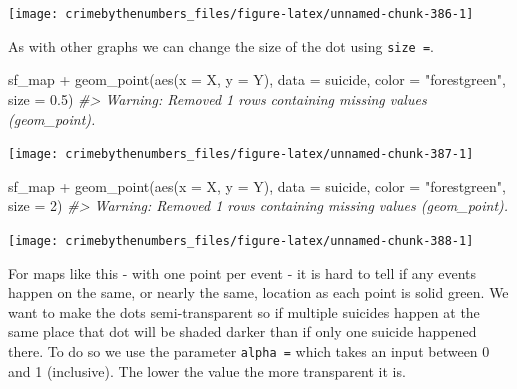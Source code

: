 \documentclass[
]{krantz}
\makeatletter
\newenvironment{Shaded}{\begin{snugshade}}{\end{snugshade}}
\newcommand{\AttributeTok}[1]{\textcolor[rgb]{0.61,0.61,0.61}{#1}}
\newcommand{\CommentTok}[1]{\textcolor[rgb]{0.37,0.37,0.37}{\textit{#1}}}
\newcommand{\DecValTok}[1]{\textcolor[rgb]{0.06,0.06,0.06}{#1}}
\newcommand{\FloatTok}[1]{\textcolor[rgb]{0.06,0.06,0.06}{#1}}
\newcommand{\FunctionTok}[1]{\textcolor[rgb]{0,0,0}{#1}}
\newcommand{\NormalTok}[1]{#1}
\newcommand{\SpecialCharTok}[1]{\textcolor[rgb]{0,0,0}{#1}}
\newcommand{\StringTok}[1]{\textcolor[rgb]{0.5,0.5,0.5}{#1}}
\newenvironment{kframe}{%
\medskip{}
\setlength{\fboxsep}{.8em}
 \def\at@end@of@kframe{}%
 \ifinner\ifhmode%
  \def\at@end@of@kframe{\end{minipage}}%
  \begin{minipage}{\columnwidth}%
 \fi\fi%
 \def\FrameCommand##1{\hskip\@totalleftmargin \hskip-\fboxsep
 \colorbox{shadecolor}{##1}\hskip-\fboxsep
     \hskip-\linewidth \hskip-\@totalleftmargin \hskip\columnwidth}%
 \MakeFramed {\advance\hsize-\width
   \@totalleftmargin\z@ \linewidth\hsize
   \@setminipage}}%
 {\par\unskip\endMakeFramed%
 \at@end@of@kframe}
\renewenvironment{Shaded}{\begin{kframe}}{\end{kframe}}
\makeatother
\begin{document}
\begin{center}\texttt{[image: crimebythenumbers\_files/figure-latex/unnamed-chunk-386-1]} \end{center}

As with other graphs we can change the size of the dot using \texttt{size\ =}.

\begin{Shaded}
\begin{Highlighting}[]
\NormalTok{sf\_map }\SpecialCharTok{+}
  \FunctionTok{geom\_point}\NormalTok{(}\FunctionTok{aes}\NormalTok{(}\AttributeTok{x =}\NormalTok{ X, }\AttributeTok{y =}\NormalTok{ Y),}
             \AttributeTok{data  =}\NormalTok{ suicide,}
             \AttributeTok{color =} \StringTok{"forestgreen"}\NormalTok{,}
             \AttributeTok{size  =} \FloatTok{0.5}\NormalTok{)}
\CommentTok{\#\textgreater{} Warning: Removed 1 rows containing missing values (geom\_point).}
\end{Highlighting}
\end{Shaded}

\begin{center}\texttt{[image: crimebythenumbers\_files/figure-latex/unnamed-chunk-387-1]} \end{center}

\begin{Shaded}
\begin{Highlighting}[]
\NormalTok{sf\_map }\SpecialCharTok{+}
  \FunctionTok{geom\_point}\NormalTok{(}\FunctionTok{aes}\NormalTok{(}\AttributeTok{x =}\NormalTok{ X, }\AttributeTok{y =}\NormalTok{ Y),}
             \AttributeTok{data  =}\NormalTok{ suicide,}
             \AttributeTok{color =} \StringTok{"forestgreen"}\NormalTok{,}
             \AttributeTok{size  =} \DecValTok{2}\NormalTok{)}
\CommentTok{\#\textgreater{} Warning: Removed 1 rows containing missing values (geom\_point).}
\end{Highlighting}
\end{Shaded}

\begin{center}\texttt{[image: crimebythenumbers\_files/figure-latex/unnamed-chunk-388-1]} \end{center}

For maps like this - with one point per event - it is hard to tell if any events happen on the same, or nearly the same, location as each point is solid green. We want to make the dots semi-transparent so if multiple suicides happen at the same place that dot will be shaded darker than if only one suicide happened there. To do so we use the parameter \texttt{alpha\ =} which takes an input between 0 and 1 (inclusive). The lower the value the more transparent it is.
\end{document}

